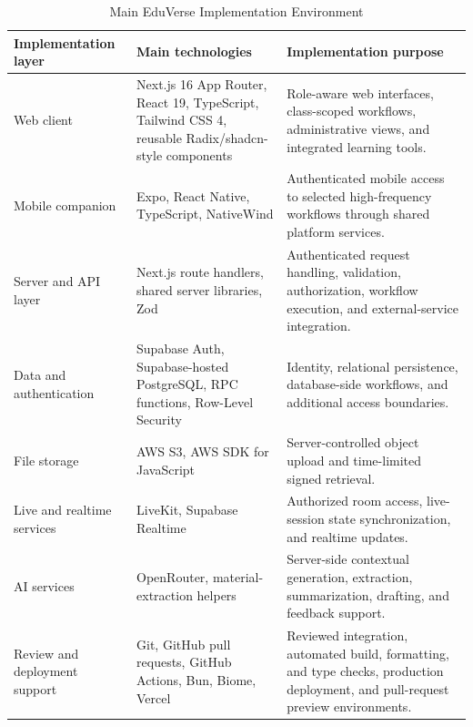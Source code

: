 \begin{table}[htbp]
  \centering
  \small
  \renewcommand{\arraystretch}{1.05}
  \setlength{\tabcolsep}{5pt}
  \caption{Main EduVerse Implementation Environment}
  \label{tab:eduverse_implementation_environment}
  \begin{tabular}{|>{\raggedright\arraybackslash}p{}|>{\raggedright\arraybackslash}p{}|>{\raggedright\arraybackslash}p{}|}
    \hline
    \textbf{Implementation layer} & \textbf{Main technologies} & \textbf{Implementation purpose} \\
    \hline
    Web client & Next.js 16 App Router, React 19, TypeScript, Tailwind CSS 4, reusable Radix/shadcn-style components & Role-aware web interfaces, class-scoped workflows, administrative views, and integrated learning tools. \\
    \hline
    Mobile companion & Expo, React Native, TypeScript, NativeWind & Authenticated mobile access to selected high-frequency workflows through shared platform services. \\
    \hline
    Server and API layer & Next.js route handlers, shared server libraries, Zod & Authenticated request handling, validation, authorization, workflow execution, and external-service integration. \\
    \hline
    Data and authentication & Supabase Auth, Supabase-hosted PostgreSQL, RPC functions, Row-Level Security & Identity, relational persistence, database-side workflows, and additional access boundaries. \\
    \hline
    File storage & AWS S3, AWS SDK for JavaScript & Server-controlled object upload and time-limited signed retrieval. \\
    \hline
    Live and realtime services & LiveKit, Supabase Realtime & Authorized room access, live-session state synchronization, and realtime updates. \\
    \hline
    AI services & OpenRouter, material-extraction helpers & Server-side contextual generation, extraction, summarization, drafting, and feedback support. \\
    \hline
    Review and deployment support & Git, GitHub pull requests, GitHub Actions, Bun, Biome, Vercel & Reviewed integration, automated build, formatting, and type checks, production deployment, and pull-request preview environments. \\
    \hline
  \end{tabular}
\end{table}

